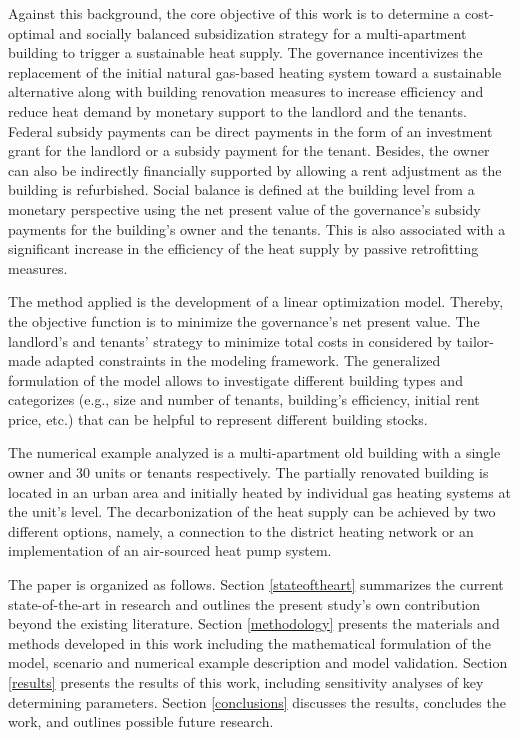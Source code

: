 Against this background, the core objective of this work is to determine a cost-optimal and socially balanced subsidization strategy for a multi-apartment building to trigger a sustainable heat supply. The governance incentivizes the replacement of the initial natural gas-based heating system toward a sustainable alternative along with building renovation measures to increase efficiency and reduce heat demand by monetary support to the landlord and the tenants. Federal subsidy payments can be direct payments in the form of an investment grant for the landlord or a subsidy payment for the tenant. Besides, the owner can also be indirectly financially supported by allowing a rent adjustment as the building is refurbished. Social balance is defined at the building level from a monetary perspective using the net present value of the governance's subsidy payments for the building's owner and the tenants. This is also associated with a significant increase in the efficiency of the heat supply by passive retrofitting measures.\vspace{0.5cm}

The method applied is the development of a linear optimization model. Thereby, the objective function is to minimize the governance's net present value. The landlord's and tenants' strategy to minimize total costs in considered by tailor-made adapted constraints in the modeling framework. The generalized formulation of the model allows to investigate different building types and categorizes (e.g., size and number of tenants, building's efficiency, initial rent price, etc.) that can be helpful to represent different building stocks.\vspace{0.5cm}

The numerical example analyzed is a multi-apartment old building with a single owner and 30 units or tenants respectively. The partially renovated building is located in an urban area and initially heated by individual gas heating systems at the unit's level. The decarbonization of the heat supply can be achieved by two different options, namely, a connection to the district heating network or an implementation of an air-sourced heat pump system.\vspace{0.5cm}

The paper is organized as follows. Section \ref{stateoftheart} summarizes the current state-of-the-art in research and outlines the present study’s own contribution beyond the existing literature. Section \ref{methodology} presents the materials and methods developed in this work including the mathematical formulation of the model, scenario and numerical example description and model validation. Section \ref{results} presents the results of this work, including sensitivity analyses of key determining parameters. Section \ref{conclusions} discusses the results, concludes the work, and outlines possible future research.
